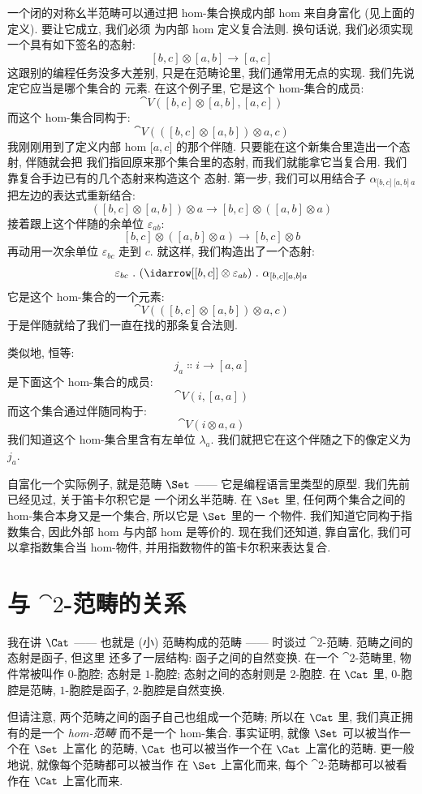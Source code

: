 一个闭的对称幺半范畴可以通过把 hom-集合换成内部 hom 来自身富化 (见上面的定义). 要让它成立, 我们必须
为内部 hom 定义复合法则. 换句话说, 我们必须实现一个具有如下签名的态射:
\[[b, c] \otimes [a, b] \to [a, c]\]
这跟别的编程任务没多大差别, 只是在范畴论里, 我们通常用无点的实现. 我们先说定它应当是哪个集合的
元素. 在这个例子里, 它是这个 hom-集合的成员:
\[\cat{V}([b, c] \otimes [a, b], [a, c])\]
而这个 hom-集合同构于:
\[\cat{V}(([b, c] \otimes [a, b]) \otimes a, c)\]
我刚刚用到了定义内部 hom ${[}a, c{]}$ 的那个伴随. 只要能在这个新集合里造出一个态射, 伴随就会把
我们指回原来那个集合里的态射, 而我们就能拿它当复合用. 我们靠复合手边已有的几个态射来构造这个
态射. 第一步, 我们可以用结合子 $\alpha_{{[}b, c{]}\ {[}a, b{]}\ a}$ 把左边的表达式重新结合:
\[([b, c] \otimes [a, b]) \otimes a \to [b, c] \otimes ([a, b] \otimes a)\]
接着跟上这个伴随的余单位 $\varepsilon_{a b}$:
\[[b, c] \otimes ([a, b] \otimes a) \to [b, c] \otimes b\]
再动用一次余单位 $\varepsilon_{b c}$ 走到 $c$. 就这样, 我们构造出了一个态射:
\[\varepsilon_{b c}\ .\ (\idarrow[{[b, c]}] \otimes \varepsilon_{a b})\ .\ \alpha_{[b, c] [a, b] a}\]
它是这个 hom-集合的一个元素:
\[\cat{V}(([b, c] \otimes [a, b]) \otimes a, c)\]
于是伴随就给了我们一直在找的那条复合法则.

类似地, 恒等:
\[j_a \Colon i \to [a, a]\]
是下面这个 hom-集合的成员:
\[\cat{V}(i, [a, a])\]
而这个集合通过伴随同构于:
\[\cat{V}(i \otimes a, a)\]
我们知道这个 hom-集合里含有左单位 $\lambda_a$. 我们就把它在这个伴随之下的像定义为 $j_a$.

自富化一个实际例子, 就是范畴 $\Set$ —— 它是编程语言里类型的原型. 我们先前已经见过, 关于笛卡尔积它是
一个闭幺半范畴. 在 $\Set$ 里, 任何两个集合之间的 hom-集合本身又是一个集合, 所以它是 $\Set$ 里的一
个物件. 我们知道它同构于指数集合, 因此外部 hom 与内部 hom 是等价的. 现在我们还知道, 靠自富化, 我们可
以拿指数集合当 hom-物件, 并用指数物件的笛卡尔积来表达复合.

\section{与 $\cat{2}$-范畴的关系}

我在讲 $\Cat$ —— 也就是 (小) 范畴构成的范畴 —— 时谈过 $\cat{2}$-范畴. 范畴之间的态射是函子, 但这里
还多了一层结构: 函子之间的自然变换. 在一个 $\cat{2}$-范畴里, 物件常被叫作 $0$-胞腔; 态射是
$1$-胞腔; 态射之间的态射则是 $2$-胞腔. 在 $\Cat$ 里, $0$-胞腔是范畴, $1$-胞腔是函子,
$2$-胞腔是自然变换.

但请注意, 两个范畴之间的函子自己也组成一个范畴; 所以在 $\Cat$ 里, 我们真正拥有的是一个
\emph{hom-范畴} 而不是一个 hom-集合. 事实证明, 就像 $\Set$ 可以被当作一个在 $\Set$ 上富化
的范畴, $\Cat$ 也可以被当作一个在 $\Cat$ 上富化的范畴. 更一般地说, 就像每个范畴都可以被当作
在 $\Set$ 上富化而来, 每个 $\cat{2}$-范畴都可以被看作在 $\Cat$ 上富化而来.
